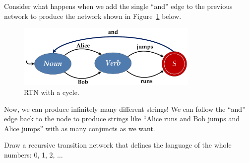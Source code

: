 Consider what happens when we add the single ``and'' edge to the previous network to produce the network shown in Figure~\ref{fig:cycle-rtn} below.

\begin{figure}[!ht]\centering
\includegraphics[height=1.2in]{figures/cycle-rtn.pdf}
\caption{RTN with a cycle.}\label{fig:cycle-rtn}
\end{figure}

Now, we can produce infinitely many different strings!  We can follow the ``and'' edge back to the  node to produce strings like ``Alice runs and Bob jumps and Alice jumps'' with as many conjuncts as we want.

\beforeex
\begin{exercise} \bluestar
Draw a recursive transition network that defines the language of the whole numbers: 0, 1, 2, $\ldots$
\end{exercise}
\afterex

